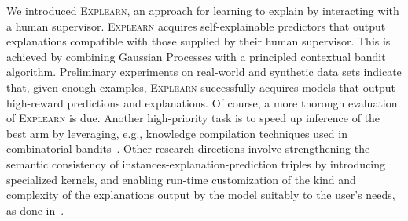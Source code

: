 \documentclass[letterpaper]{article} %
\newcommand{\explearn}{\textsc{Explearn}\xspace}
\begin{document}
We introduced \explearn, an approach for learning to explain by interacting with a human supervisor.  \explearn acquires self-explainable predictors that output explanations compatible with those supplied by their human supervisor.  This is achieved by combining Gaussian Processes with a principled contextual bandit algorithm.  Preliminary experiments on real-world and synthetic data sets indicate that, given enough examples, \explearn successfully acquires models that output high-reward predictions and explanations.  Of course, a more thorough evaluation of \explearn is due.  Another high-priority task is to speed up inference of the best arm by leveraging, e.g., knowledge compilation techniques used in combinatorial bandits~\cite{koriche2018compiling,sakaue2018efficient}.  Other research directions involve strengthening the semantic consistency of instances-explanation-prediction triples by introducing specialized kernels, and enabling run-time customization of the kind and complexity of the explanations output by the model suitably to the user's needs, as done in~\cite{lage2018human}.


\clearpage %

\end{document}
